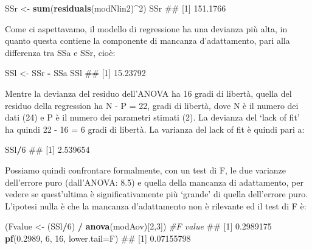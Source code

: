 \documentclass[a4paper,12pt,oneside]{book}
\newenvironment{Shaded}{\begin{snugshade}}{\end{snugshade}}
\newcommand{\KeywordTok}[1]{\textcolor[rgb]{0.13,0.29,0.53}{\textbf{#1}}}
\newcommand{\DataTypeTok}[1]{\textcolor[rgb]{0.13,0.29,0.53}{#1}}
\newcommand{\DecValTok}[1]{\textcolor[rgb]{0.00,0.00,0.81}{#1}}
\newcommand{\FloatTok}[1]{\textcolor[rgb]{0.00,0.00,0.81}{#1}}
\newcommand{\StringTok}[1]{\textcolor[rgb]{0.31,0.60,0.02}{#1}}
\newcommand{\CommentTok}[1]{\textcolor[rgb]{0.56,0.35,0.01}{\textit{#1}}}
\newcommand{\OperatorTok}[1]{\textcolor[rgb]{0.81,0.36,0.00}{\textbf{#1}}}
\newcommand{\NormalTok}[1]{#1}
\theoremstyle{definition}
\theoremstyle{definition}
\theoremstyle{definition}
\theoremstyle{remark}
\begin{document}
\begin{Shaded}
\begin{Highlighting}[]
\NormalTok{SSr <-}\StringTok{ }\KeywordTok{sum}\NormalTok{(}\KeywordTok{residuals}\NormalTok{(modNlin2)}\OperatorTok{^}\DecValTok{2}\NormalTok{)}
\NormalTok{SSr}
\NormalTok{## [1] 151.1766}
\end{Highlighting}
\end{Shaded}

Come ci aspettavamo, il modello di regressione ha una devianza più alta,
in quanto questa contiene la componente di mancanza d'adattamento, pari
alla differenza tra SSa e SSr, cioè:

\begin{Shaded}
\begin{Highlighting}[]
\NormalTok{SSl <-}\StringTok{ }\NormalTok{SSr }\OperatorTok{-}\StringTok{ }\NormalTok{SSa}
\NormalTok{SSl}
\NormalTok{## [1] 15.23792}
\end{Highlighting}
\end{Shaded}

Mentre la devianza del residuo dell'ANOVA ha 16 gradi di libertà, quella
del residuo della regression ha N - P = 22, gradi di libertà, dove N è
il numero dei dati (24) e P è il numero dei parametri stimati (2). La
devianza del `lack of fit' ha quindi 22 - 16 = 6 gradi di libertà. La
varianza del lack of fit è quindi pari a:

\begin{Shaded}
\begin{Highlighting}[]
\NormalTok{SSl}\OperatorTok{/}\DecValTok{6}
\NormalTok{## [1] 2.539654}
\end{Highlighting}
\end{Shaded}

Possiamo quindi confrontare formalmente, con un test di F, le due
varianze dell'errore puro (dall'ANOVA: 8.5) e quella della mancanza di
adattamento, per vedere se quest'ultima è significativamente più
`grande' di quella dell'errore puro. L'ipotesi nulla è che la mancanza
d'adattamento non è rilevante ed il test di F è:

\begin{Shaded}
\begin{Highlighting}[]
\NormalTok{(Fvalue <-}\StringTok{ }\NormalTok{(SSl}\OperatorTok{/}\DecValTok{6}\NormalTok{) }\OperatorTok{/}\StringTok{ }\KeywordTok{anova}\NormalTok{(modAov)[}\DecValTok{2}\NormalTok{,}\DecValTok{3}\NormalTok{]) }\CommentTok{#F value}
\NormalTok{## [1] 0.2989175}
\KeywordTok{pf}\NormalTok{(}\FloatTok{0.2989}\NormalTok{, }\DecValTok{6}\NormalTok{, }\DecValTok{16}\NormalTok{, }\DataTypeTok{lower.tail=}\NormalTok{F)}
\NormalTok{## [1] 0.07155798}
\end{Highlighting}
\end{Shaded}
\end{document}
